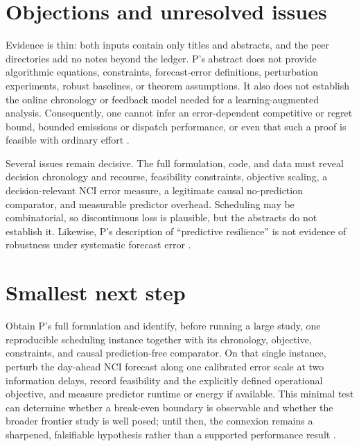 \documentclass{article}
\begin{document}
\section{Objections and unresolved issues}

Evidence is thin: both inputs contain only titles and abstracts, and the peer directories add no notes beyond the ledger.  P's abstract does not provide algorithmic equations, constraints, forecast-error definitions, perturbation experiments, robust baselines, or theorem assumptions.  It also does not establish the online chronology or feedback model needed for a learning-augmented analysis.  Consequently, one cannot infer an error-dependent competitive or regret bound, bounded emissions or dispatch performance, or even that such a proof is feasible with ordinary effort .

Several issues remain decisive.  The full formulation, code, and data must reveal decision chronology and recourse, feasibility constraints, objective scaling, a decision-relevant NCI error measure, a legitimate causal no-prediction comparator, and measurable predictor overhead.  Scheduling may be combinatorial, so discontinuous loss is plausible, but the abstracts do not establish it.  Likewise, P's description of ``predictive resilience'' is not evidence of robustness under systematic forecast error .

\section{Smallest next step}

Obtain P's full formulation and identify, before running a large study, one reproducible scheduling instance together with its chronology, objective, constraints, and causal prediction-free comparator.  On that single instance, perturb the day-ahead NCI forecast along one calibrated error scale at two information delays, record feasibility and the explicitly defined operational objective, and measure predictor runtime or energy if available.  This minimal test can determine whether a break-even boundary is observable and whether the broader frontier study is well posed; until then, the connexion remains a sharpened, falsifiable hypothesis rather than a supported performance result .
\end{document}
